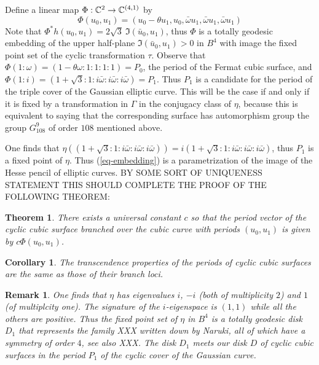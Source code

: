 \documentclass[11pt]{amsart}
\newtheorem{theorem}{Theorem}
\newtheorem{corollary}{Corollary}
\newtheorem{remark}{Remark}
\begin{document}
Define a linear map $\Phi:{\mathbb C}^2\to {\mathbb C}^{(4,1)}$ by 
\begin{equation}
\label{eq-embedding}
\Phi(u_0,u_1) = (u_0 - \theta u_1,u_0,\bar\omega u_1,\bar\omega u_1,\bar\omega u_1)
\end{equation} 
Note that $\Phi^* h (u_0,u_1) = 2\sqrt{3}\  \Im{ ( \bar u_0, u_1)}$, thus $\Phi$ is a totally geodesic embedding of the upper half-plane $\Im{(\bar u_0, u_1)} >0 $ in $B^4$ with image the fixed point set of the cyclic transformation $\tau$.   Observe that $\Phi(1:\omega) = (1 - \theta\omega : 1:1:1:1) = P_0$, the period of the Fermat cubic surface, and $\Phi(1:i) = (1+\sqrt{3}:1:i\bar\omega:i\bar\omega:i\bar\omega) = P_1$.  Thus $P_1$ is a candidate for the period of the triple cover of the Gaussian elliptic curve.   This will be the case if and only if it is fixed by a transformation in $\Gamma$ in the conjugacy class of $\eta$, because this is equivalent to saying that the corresponding surface has automorphism group the group $G_{108}^9$ of order $108$ mentioned above.

One finds that $\eta((1+\sqrt{3}:1:i\bar\omega:i\bar\omega:i\bar\omega)) = i (1+\sqrt{3}:1:i\bar\omega:i\bar\omega:i\bar\omega)$, thus $P_1$ is a fixed point of $\eta$.  Thus (\ref{eq-embedding}) is a parametrization of the image of the Hesse pencil of elliptic curves.   BY SOME SORT OF UNIQUENESS STATEMENT THIS SHOULD COMPLETE THE PROOF OF THE FOLLOWING THEOREM:

\begin{theorem}
There exists a universal constant $c$ so that the period vector of the cyclic cubic surface branched over the cubic curve with periods $(u_0,u_1)$ is given by $c\Phi(u_0,u_1)$.

\end{theorem}

\begin{corollary}
The transcendence properties of the periods of cyclic cubic surfaces are the same as those of their branch loci.
\end{corollary}

\begin{remark}
One finds that $\eta$ has eigenvalues $i$, $-i$ (both of multiplicity $2$) and $1$ (of multiplcity one).  The signature of the $i$-eigenspace is $(1,1)$ while all the others are positive.  Thus the fixed point set of $\eta$ in $B^4$ is a totally geodesic disk $D_1$ that represents the family XXX written down by Naruki, all of which have a symmetry of order $4$, see also XXX.  The disk $D_1$ meets our disk $D$ of cyclic cubic surfaces in the period $P_1$ of the cyclic cover of the Gaussian curve.
\end{remark}
\end{document}
